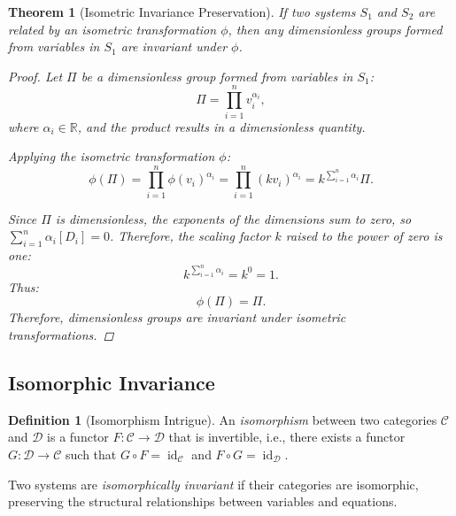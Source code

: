 \documentclass{article}
\newtheorem{theorem}{Theorem}[section]
\theoremstyle{definition}
\newtheorem{definition}{Definition}[section]
\theoremstyle{remark}
\begin{document}
	\begin{theorem}[Isometric Invariance Preservation]
		If two systems $S_1$ and $S_2$ are related by an isometric transformation $\phi$, then any dimensionless groups formed from variables in $S_1$ are invariant under $\phi$.
		
		\begin{proof}
			Let $\Pi$ be a dimensionless group formed from variables in $S_1$:
			\[
			\Pi = \prod_{i=1}^n v_i^{\alpha_i},
			\]
			where $\alpha_i \in \mathbb{R}$, and the product results in a dimensionless quantity.
			
			Applying the isometric transformation $\phi$:
			\[
			\phi(\Pi) = \prod_{i=1}^n \phi(v_i)^{\alpha_i} = \prod_{i=1}^n (k v_i)^{\alpha_i} = k^{\sum_{i=1}^n \alpha_i} \Pi.
			\]
			
			Since $\Pi$ is dimensionless, the exponents of the dimensions sum to zero, so $\sum_{i=1}^n \alpha_i [D_i] = 0$. Therefore, the scaling factor $k$ raised to the power of zero is one:
			\[
			k^{\sum_{i=1}^n \alpha_i} = k^0 = 1.
			\]
			Thus:
			\[
			\phi(\Pi) = \Pi.
			\]
			Therefore, dimensionless groups are invariant under isometric transformations.
		\end{proof}
	\end{theorem}
	
	\subsection{Isomorphic Invariance}
	
	\begin{definition}[Isomorphism Intrigue]
		An \emph{isomorphism} between two categories $\mathcal{C}$ and $\mathcal{D}$ is a functor $F: \mathcal{C} \rightarrow \mathcal{D}$ that is invertible, i.e., there exists a functor $G: \mathcal{D} \rightarrow \mathcal{C}$ such that $G \circ F = \operatorname{id}_{\mathcal{C}}$ and $F \circ G = \operatorname{id}_{\mathcal{D}}$.
		
		Two systems are \emph{isomorphically invariant} if their categories are isomorphic, preserving the structural relationships between variables and equations.
	\end{definition}
	
\end{document}
